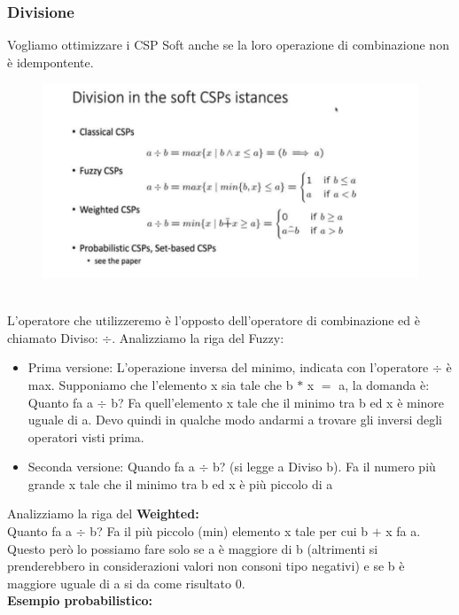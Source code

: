 \subsubsection{Divisione}
Vogliamo ottimizzare i CSP Soft anche se la loro operazione di combinazione non è idempontente.
\begin{figure}[htp]
	\centering
    \includegraphics[width=12cm, keepaspectratio]{img/Cap5/DIvisione.png}
\end{figure}
\\L’operatore che utilizzeremo è l’opposto dell’operatore di combinazione ed è chiamato Diviso: $\div$. Analizziamo la riga del Fuzzy:
\begin{itemize}
    \item Prima versione: L’operazione inversa del minimo, indicata con l’operatore $\div$ è max. Supponiamo che l’elemento x sia tale che b $*$ x $=$ a, la domanda è: Quanto fa a $\div$ b? Fa quell’elemento x tale che il minimo tra b ed x è minore uguale di a. Devo quindi in qualche modo andarmi a trovare gli inversi degli operatori visti prima.
    \item  Seconda versione: Quando fa a $\div$ b? (si legge a Diviso b). Fa il numero più grande x tale che il minimo tra b ed x è più piccolo di a
\end{itemize}
Analizziamo la riga del \textbf{Weighted:}
\\Quanto fa a $\div$ b? Fa il più piccolo (min) elemento x tale per cui b $+$ x fa a. Questo però lo possiamo fare solo se a è maggiore di b (altrimenti si prenderebbero in considerazioni valori non consoni tipo negativi) e se b è maggiore uguale di a si da come risultato 0.
\\\textbf{Esempio probabilistico:}
